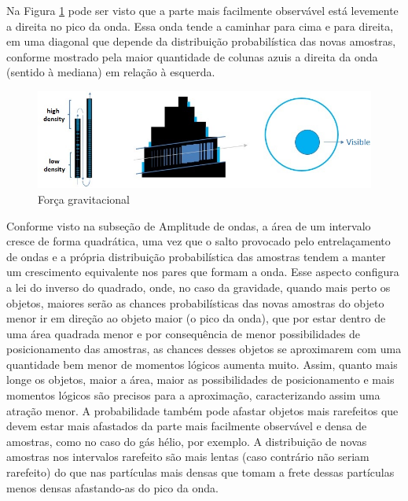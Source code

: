 Na Figura \ref{fig:consciousness_gravitational_force} pode ser visto que a parte mais facilmente observável está levemente a direita no pico da onda. Essa onda tende a caminhar para cima e para direita, em uma diagonal que depende da distribuição probabilística das novas amostras, conforme mostrado pela maior quantidade de colunas azuis a direita da onda (sentido à mediana) em relação à esquerda.
	\begin{figure}[H]
	\caption{Força gravitacional}
	\label{fig:consciousness_gravitational_force}
	\centering
	\includegraphics[scale=.7]{sections/images/consciousness_gravitational_force.jpg}
	\end{figure}

Conforme visto na subseção de Amplitude de ondas, a área de um intervalo cresce de forma quadrática, uma vez que o salto provocado pelo entrelaçamento de ondas e a própria distribuição probabilística das amostras tendem a manter um crescimento equivalente nos pares que formam a onda. Esse aspecto configura a lei do inverso do quadrado, onde, no caso da gravidade, quando mais perto os objetos, maiores serão as chances probabilísticas das novas amostras do objeto menor ir em direção ao objeto maior (o pico da onda), que por estar dentro de uma área quadrada menor e por consequência de menor possibilidades de posicionamento das amostras, as chances desses objetos se aproximarem com uma quantidade bem menor de momentos lógicos aumenta muito. Assim, quanto mais longe os objetos, maior a área, maior as possibilidades de posicionamento e mais momentos lógicos são precisos para a aproximação, caracterizando assim uma atração menor. A probabilidade também pode afastar objetos mais rarefeitos que devem estar mais afastados da parte mais facilmente observável e densa de amostras, como no caso do gás hélio, por exemplo. A distribuição de novas amostras nos intervalos rarefeito são mais lentas (caso contrário não seriam rarefeito) do que nas partículas mais densas que tomam a frete dessas partículas menos densas afastando-as do pico da onda. 

